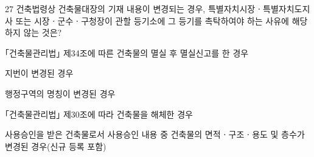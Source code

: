 \begin{question}{27}
건축법령상 건축물대장의 기재 내용이 변경되는 경우, 특별자치시장ㆍ특별자치도지사 또는 시장ㆍ군수ㆍ구청장이 관할 등기소에 그 등기를 촉탁하여야 하는 사유에 해당하지 않는 것은?
\begin{choices}
  \item ｢건축물관리법｣ 제34조에 따른 건축물의 멸실 후 멸실신고를 한 경우
  \item 지번이 변경된 경우
  \item 행정구역의 명칭이 변경된 경우
  \item ｢건축물관리법｣ 제30조에 따라 건축물을 해체한 경우
  \item 사용승인을 받은 건축물로서 사용승인 내용 중 건축물의 면적ㆍ구조ㆍ용도 및 층수가 변경된 경우(신규 등록 포함)
\end{choices}
\end{question}

